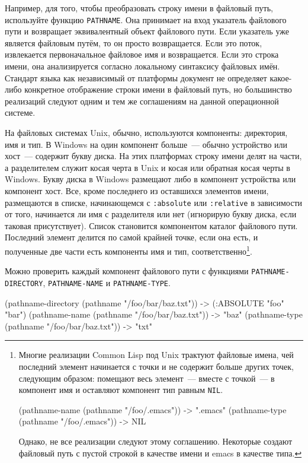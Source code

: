 Например, для того, чтобы преобразовать строку имени в файловый путь, используйте функцию
\lstinline{PATHNAME}. Она принимает на вход указатель файлового пути и возвращает эквивалентный
объект файлового пути. Если указатель уже является файловым путём, то он просто
возвращается. Если это поток, извлекается первоначальное файловое имя и возвращается. Если
это строка имени, она анализируется согласно локальному синтаксису файловых имён. Стандарт
языка как независимый от платформы документ не определяет какое-либо конкретное
отображение строки имени в файловый путь, но большинство реализаций следуют одним и тем же
соглашениям на данной операционной системе.

На файловых системах Unix, обычно, используются компоненты: директория, имя и тип. В
Windows на один компонент больше~--- обычно устройство или хост~--- содержит букву диска. На
этих платформах строку имени делят на части, а разделителем служит косая черта в Unix и
косая или обратная косая черты в Windows. Букву диска в Windows размещают либо в компонент
устройства или компонент хост. Все, кроме последнего из оставшихся элементов имени,
размещаются в списке, начинающемся с \lstinline{:absolute} или \lstinline{:relative} в зависимости
от того, начинается ли имя с разделителя или нет (игнорирую букву диска, если таковая
присутствует). Список становится компонентом каталог файлового пути. Последний элемент
делится по самой крайней точке, если она есть, и полученные две части есть компоненты имя
и тип, соответственно\footnote{Многие реализации Common Lisp под Unix трактуют файловые
  имена, чей последний элемент начинается с точки и не содержит больше других точек,
  следующим образом: помещают весь элемент~--- вместе с точкой~--- в компонент имя и
  оставляют компонент тип равным \lstinline{NIL}.

\begin{myverb}
(pathname-name (pathname "/foo/.emacs")) -> ".emacs" 
(pathname-type (pathname "/foo/.emacs")) -> NIL 
\end{myverb}

Однако, не все реализации следуют этому соглашению. Некоторые создают файловый путь с
пустой строкой в качестве имени и emacs в качестве типа.}\hspace{\footnotenegspace}.

Можно проверить каждый компонент файлового пути с функциями \lstinline{PATHNAME-DIRECTORY},
\lstinline{PATHNAME-NAME} и \lstinline{PATHNAME-TYPE}.

\begin{myverb}
(pathname-directory (pathname "/foo/bar/baz.txt")) -> (:ABSOLUTE "foo" "bar") 
(pathname-name (pathname "/foo/bar/baz.txt"))      -> "baz" 
(pathname-type (pathname "/foo/bar/baz.txt"))      -> "txt" 
\end{myverb}

